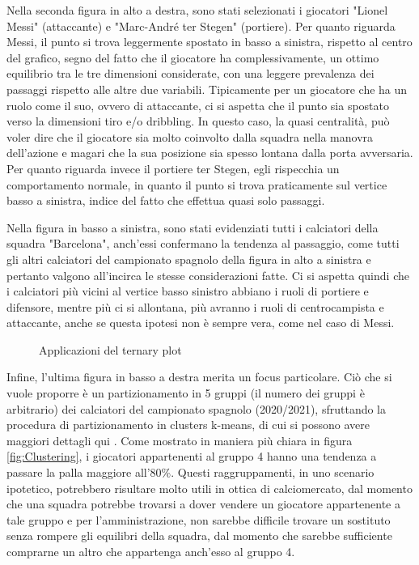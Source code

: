             Nella seconda figura in alto a destra, sono stati selezionati i giocatori "Lionel Messi" (attaccante) e "Marc-André ter Stegen" (portiere). Per quanto riguarda Messi, il punto si trova leggermente spostato in basso a sinistra, rispetto al centro del grafico, segno del fatto che il giocatore ha complessivamente, un ottimo equilibrio tra le tre dimensioni considerate, con una leggere prevalenza dei passaggi rispetto alle altre due variabili. Tipicamente per un giocatore che ha un ruolo come il suo, ovvero di attaccante, ci si aspetta che il punto sia spostato verso la dimensioni tiro e/o dribbling. In questo caso, la quasi centralità, può voler dire che il giocatore sia molto coinvolto dalla squadra nella manovra dell'azione e magari che la sua posizione sia spesso lontana dalla porta avversaria. Per quanto riguarda invece il portiere ter Stegen, egli rispecchia un comportamento normale, in quanto il punto si trova praticamente sul vertice basso a sinistra, indice del fatto che effettua quasi solo passaggi.
            
            Nella figura in basso a sinistra, sono stati evidenziati tutti i calciatori della squadra "Barcelona", anch'essi confermano la tendenza al passaggio, come tutti gli altri calciatori del campionato spagnolo della figura in alto a sinistra e pertanto valgono all'incirca le stesse considerazioni fatte. Ci si aspetta quindi che i calciatori più vicini al vertice basso sinistro abbiano i ruoli di portiere e difensore, mentre più ci si allontana, più avranno i ruoli di centrocampista e attaccante, anche se questa ipotesi non è sempre vera, come nel caso di Messi.
            
            \begin{figure}[h]
                \caption{Applicazioni del ternary plot}\label{fig:ternary}
            \end{figure}

            Infine, l'ultima figura in basso a destra merita un focus particolare. Ciò che si vuole proporre è un partizionamento in 5 gruppi (il numero dei gruppi è arbitrario) dei calciatori del campionato spagnolo (2020/2021), sfruttando la procedura di partizionamento in clusters k-means, di cui si possono avere maggiori dettagli qui \cite{K-means}. Come mostrato in maniera più chiara in figura \ref{fig:Clustering}, i giocatori appartenenti al gruppo 4 hanno una tendenza a passare la palla maggiore all'80\%. Questi raggruppamenti, in uno scenario ipotetico, potrebbero risultare molto utili in ottica di calciomercato, dal momento che una squadra potrebbe trovarsi a dover vendere un giocatore appartenente a tale gruppo e per l'amministrazione, non sarebbe difficile trovare un sostituto senza rompere gli equilibri della squadra, dal momento che sarebbe sufficiente comprarne un altro che appartenga anch'esso al gruppo 4.

